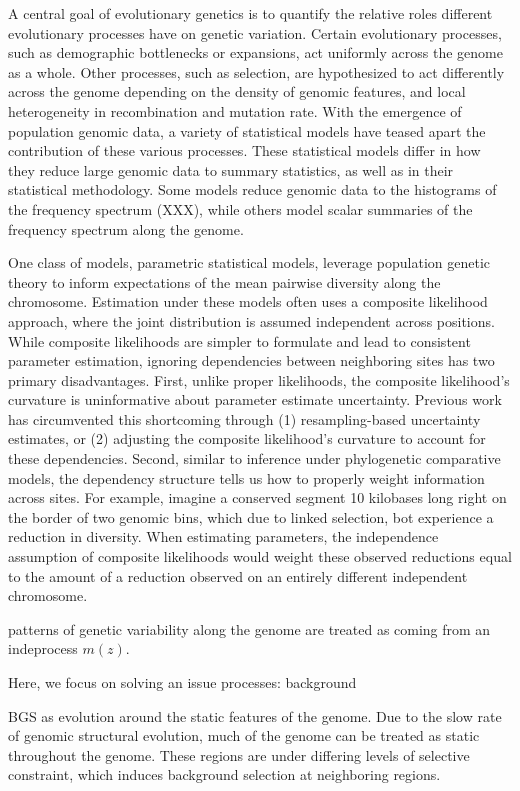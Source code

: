 \documentclass[11pt]{article}
\title{}
\author{Vince Buffalo and Andrew Kern}
\begin{document}
\maketitle

A central goal of evolutionary genetics is to quantify the relative roles
different evolutionary processes have on genetic variation. Certain
evolutionary processes, such as demographic bottlenecks or expansions, act
uniformly across the genome as a whole. Other processes, such as selection, are
hypothesized to act differently across the genome depending on the density of
genomic features, and local heterogeneity in recombination and mutation rate.
With the emergence of population genomic data, a variety of statistical models
have teased apart the contribution of these various processes. These
statistical models differ in how they reduce large genomic data to summary
statistics, as well as in their statistical methodology. Some models reduce
genomic data to the histograms of the frequency spectrum (XXX), while others
model scalar summaries of the frequency spectrum along the genome. 

One class of models, parametric statistical models, leverage population genetic
theory to inform expectations of the mean pairwise diversity along the
chromosome. Estimation under these models often uses a composite likelihood
approach, where the joint distribution is assumed independent across positions.
While composite likelihoods are simpler to formulate and lead to consistent
parameter estimation, ignoring dependencies between neighboring sites has two
primary disadvantages. First, unlike proper likelihoods, the composite
likelihood's curvature is uninformative about parameter estimate uncertainty.
Previous work has circumvented this shortcoming through (1) resampling-based
uncertainty estimates, or (2) adjusting the composite likelihood's curvature to
account for these dependencies. Second, similar to inference under phylogenetic
comparative models, the dependency structure tells us how to properly weight
information across sites. For example, imagine a conserved segment 10 kilobases
long right on the border of two genomic bins, which due to linked selection,
bot experience a reduction in diversity. When estimating parameters, the
independence assumption of composite likelihoods would weight these observed
reductions equal to the amount of a reduction observed on an entirely different
independent chromosome. 

patterns of genetic variability along the genome are treated as
coming from an indeprocess $m(z)$.


Here, we focus on solving an issue processes: background

BGS as evolution around the static features of the genome. Due to the slow rate
of genomic structural evolution, much of the genome can be treated as static
throughout the genome. These regions are under differing levels of selective
constraint, which induces background selection at neighboring regions.




\printbibliography
\end{document}
